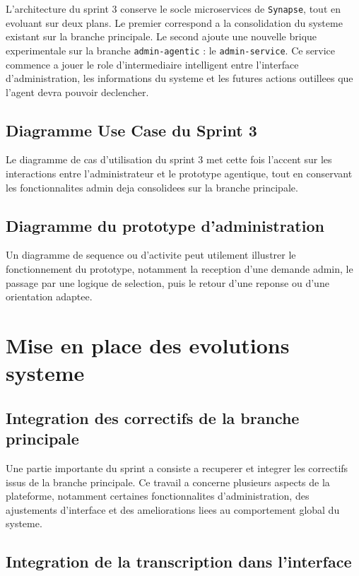 L'architecture du sprint 3 conserve le socle microservices de \texttt{Synapse}, tout en evoluant sur deux plans. Le premier correspond a la consolidation du systeme existant sur la branche principale. Le second ajoute une nouvelle brique experimentale sur la branche \texttt{admin-agentic} : le \texttt{admin-service}. Ce service commence a jouer le role d'intermediaire intelligent entre l'interface d'administration, les informations du systeme et les futures actions outillees que l'agent devra pouvoir declencher.

\subsection{Diagramme Use Case du Sprint 3}

Le diagramme de cas d'utilisation du sprint 3 met cette fois l'accent sur les interactions entre l'administrateur et le prototype agentique, tout en conservant les fonctionnalites admin deja consolidees sur la branche principale.

\subsection{Diagramme du prototype d'administration}

Un diagramme de sequence ou d'activite peut utilement illustrer le fonctionnement du prototype, notamment la reception d'une demande admin, le passage par une logique de selection, puis le retour d'une reponse ou d'une orientation adaptee.

\section{Mise en place des evolutions systeme}

\subsection{Integration des correctifs de la branche principale}

Une partie importante du sprint a consiste a recuperer et integrer les correctifs issus de la branche principale. Ce travail a concerne plusieurs aspects de la plateforme, notamment certaines fonctionnalites d'administration, des ajustements d'interface et des ameliorations liees au comportement global du systeme.

\subsection{Integration de la transcription dans l'interface}

